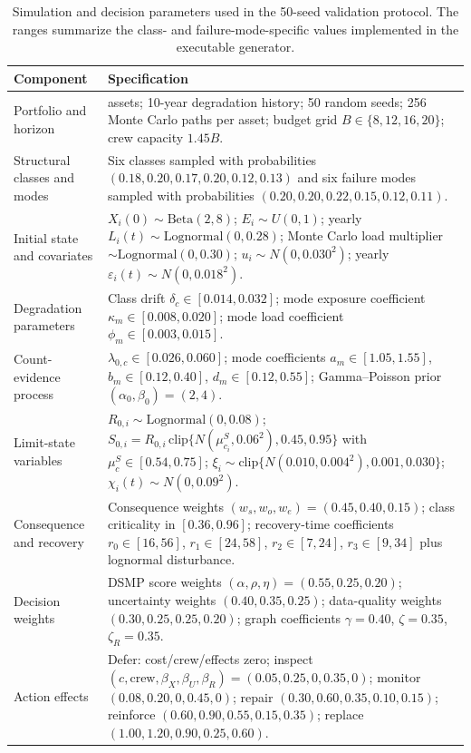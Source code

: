\begin{table}[t]
\centering
\scriptsize
\caption{Simulation and decision parameters used in the 50-seed validation protocol. The ranges summarize the class- and failure-mode-specific values implemented in the executable generator.}
\label{tab:simulator-parameters}
\begin{tabular*}{\textwidth}{@{\extracolsep{\fill}}>{\raggedright\arraybackslash}p{}>{\raggedright\arraybackslash}p{}}
\toprule
Component & Specification \\
\midrule
Portfolio and horizon & 300 assets; 10-year degradation history; 50 random seeds; 256 Monte Carlo paths per asset; budget grid $B\in\{8,12,16,20\}$; crew capacity $1.45B$. \\
Structural classes and modes & Six classes sampled with probabilities $(0.18,0.20,0.17,0.20,0.12,0.13)$ and six failure modes sampled with probabilities $(0.20,0.20,0.22,0.15,0.12,0.11)$. \\
Initial state and covariates & $X_i(0)\sim\mathrm{Beta}(2,8)$; $E_i\sim U(0,1)$; yearly $L_i(t)\sim\mathrm{Lognormal}(0,0.28)$; Monte Carlo load multiplier $\sim\mathrm{Lognormal}(0,0.30)$; $u_i\sim N(0,0.030^2)$; yearly $\varepsilon_i(t)\sim N(0,0.018^2)$. \\
Degradation parameters & Class drift $\delta_c\in[0.014,0.032]$; mode exposure coefficient $\kappa_m\in[0.008,0.020]$; mode load coefficient $\phi_m\in[0.003,0.015]$. \\
Count-evidence process & $\lambda_{0,c}\in[0.026,0.060]$; mode coefficients $a_m\in[1.05,1.55]$, $b_m\in[0.12,0.40]$, $d_m\in[0.12,0.55]$; Gamma--Poisson prior $(\alpha_0,\beta_0)=(2,4)$. \\
Limit-state variables & $R_{0,i}\sim\mathrm{Lognormal}(0,0.08)$; $S_{0,i}=R_{0,i}\,\mathrm{clip}\{N(\mu_{c_i}^{S},0.06^2),0.45,0.95\}$ with $\mu_c^S\in[0.54,0.75]$; $\xi_i\sim\mathrm{clip}\{N(0.010,0.004^2),0.001,0.030\}$; $\chi_i(t)\sim N(0,0.09^2)$. \\
Consequence and recovery & Consequence weights $(w_s,w_o,w_e)=(0.45,0.40,0.15)$; class criticality in $[0.36,0.96]$; recovery-time coefficients $r_0\in[16,56]$, $r_1\in[24,58]$, $r_2\in[7,24]$, $r_3\in[9,34]$ plus lognormal disturbance. \\
Decision weights & DSMP score weights $(\alpha,\rho,\eta)=(0.55,0.25,0.20)$; uncertainty weights $(0.40,0.35,0.25)$; data-quality weights $(0.30,0.25,0.25,0.20)$; graph coefficients $\gamma=0.40$, $\zeta=0.35$, $\zeta_R=0.35$. \\
Action effects & Defer: cost/crew/effects zero; inspect $(c,\mathrm{crew},\beta_X,\beta_U,\beta_R)=(0.05,0.25,0,0.35,0)$; monitor $(0.08,0.20,0,0.45,0)$; repair $(0.30,0.60,0.35,0.10,0.15)$; reinforce $(0.60,0.90,0.55,0.15,0.35)$; replace $(1.00,1.20,0.90,0.25,0.60)$. \\
\bottomrule
\end{tabular*}
\end{table}
